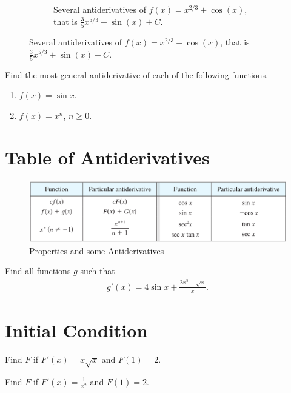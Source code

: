 \documentclass[12pt,a4paper]{article}
\newcounter{example}[section]
\begin{document}
\begin{figure}[h]
\begin{subfigure}[b]{0.49\textwidth}
		\caption{Several antiderivatives of $f(x) = x^{2/3} + \cos (x)$, that is $\frac{3}{5} x^{5/3} + \sin (x) + C$.}
		\end{subfigure}
	\end{figure}
	
	\vspace*{16pt}
	
	\begin{example}
	Find the most general antiderivative of each of the following functions.
	\begin{multicols}{3}
		\begin{enumerate}[label=\textbf{(\alph*)}]
		\item $f(x) = \sin x$.
		\item $f(x) = x^n$, $n \geq 0$.
		\end{enumerate}
	\end{multicols}
	\end{example}
	
	\newpage
	
	\section{Table of Antiderivatives}
	
	\begin{figure}[ht]
	\centering
	\includegraphics[scale=0.35]{section3-9_table.png}
	\caption{Properties and some Antiderivatives}
	\end{figure}
	
	\vspace*{20pt}
	
	\begin{example}
	Find all functions $g$ such that
		\begin{align*}
		g'(x) = 4 \sin x + \frac{2x^5 - \sqrt{x}}{x}.
		\end{align*}
	\end{example}
	
	\newpage
	
	\section{Initial Condition}	
	
	\begin{example}
	Find $F$ if $F'(x) = x \sqrt{x}$ and $F(1) = 2$.
	\end{example}
	
	\vfill
	
	\begin{example}
	Find $F$ if $F'(x) = \frac{1}{x^2}$ and $F(1) = 2$.
	\end{example}
	
	\vfill
	
	\newpage
	
	
	
	
\end{document}
